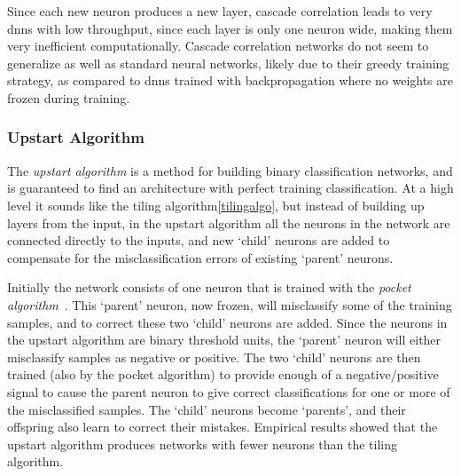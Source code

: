 \documentclass[thesis]{subfiles}
\begin{document}
	Since each new neuron produces a new layer, cascade correlation leads to very \glspl{dnn} with low throughput, since each layer is only one neuron wide, making them very inefficient computationally. Cascade correlation networks do not seem to generalize as well as standard neural networks, likely due to their greedy training strategy, as compared to \glspl{dnn} trained with backpropagation where no weights are frozen during training.

	\subsubsection{Upstart Algorithm}
	The \emph{upstart algorithm} is a method for building binary classification networks, and is guaranteed to find an architecture with perfect training classification. At a high level it sounds like the tiling algorithm\cref{tilingalgo}, but instead of building up layers from the input, in the upstart algorithm all the neurons in the network are connected directly to the inputs, and new `child' neurons are added to compensate for the misclassification errors of existing `parent' neurons.
	
	Initially the network consists of one neuron that is trained with the \emph{pocket algorithm}~\citep{gallant1986optimal}. This `parent' neuron, now frozen, will misclassify some of the training samples, and to correct these two `child' neurons are added. Since the neurons in the upstart algorithm are binary threshold units, the `parent' neuron will either misclassify samples as negative or positive. The two `child' neurons are then trained (also by the pocket algorithm) to provide enough of a negative/positive signal to cause the parent neuron to give correct classifications for one or more of the misclassified samples. The `child' neurons become `parents', and their offspring also learn to correct their mistakes. Empirical results showed that the upstart algorithm produces networks with fewer neurons than the tiling algorithm.
	
	
\end{document}
